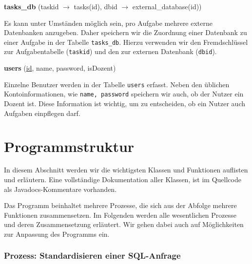 \textbf{tasks\_db} (taskid $\to$ tasks(id), dbid $\to$ external\_database(id))

Es kann unter Umständen möglich sein, pro Aufgabe mehrere externe Datenbanken anzugeben. Daher speichern wir die Zuordnung einer Datenbank zu einer Aufgabe in der Tabelle \verb|tasks_db|. Hierzu verwenden wir den Fremdschlüssel zur Aufgabentabelle (\verb|taskid|) und den zur externen Datenbank (\verb|dbid|).

\textbf{users} (\underline{id}, name, password, isDozent)

Einzelne Benutzer werden in der Tabelle \verb|users| erfasst. Neben den üblichen Kontoinformationen, wie \verb|name, password| speichern wir auch, ob der Nutzer ein Dozent ist. Diese Information ist wichtig, um zu entscheiden, ob ein Nutzer auch Aufgaben einpflegen darf.

\section{Programmstruktur}

In diesem Abschnitt werden wir die wichtigsten Klassen und Funktionen auflisten und erläutern. Eine vollständige Dokumentation aller Klassen, ist im Quellcode als Javadocs-Kommentare vorhanden. 

Das Programm beinhaltet mehrere Prozesse, die sich aus der Abfolge mehrere Funktionen zusammensetzen. Im Folgenden werden alle wesentlichen Prozesse und deren Zusammensetzung erläutert. Wir gehen dabei auch auf Möglichkeiten zur Anpassung des Programms ein.

\subsubsection{Prozess: Standardisieren einer SQL-Anfrage} 

